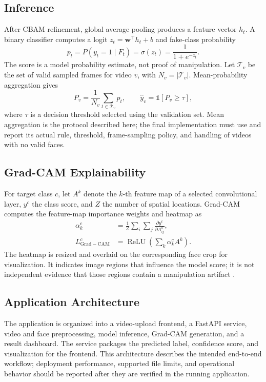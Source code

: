 \subsection{Inference}
After CBAM refinement, global average pooling produces a feature vector $h_t$. A binary classifier computes a logit $z_t=\mathbf{w}^{\top}h_t+b$ and fake-class probability
\begin{equation}
    p_t=P(y_t=1\mid F_t)=\sigma(z_t)=\frac{1}{1+e^{-z_t}}.
    \label{eq:frame-probability}
\end{equation}
The score is a model probability estimate, not proof of manipulation. Let $\mathcal{T}_v$ be the set of valid sampled frames for video $v$, with $N_v=|\mathcal{T}_v|$. Mean-probability aggregation gives
\begin{equation}
    P_v=\frac{1}{N_v}\sum_{t\in\mathcal{T}_v}p_t,\qquad
    \hat{y}_v=\mathbb{1}[P_v\geq\tau],
    \label{eq:video-aggregation}
\end{equation}
where $\tau$ is a decision threshold selected using the validation set. Mean aggregation is the protocol described here; the final implementation must use and report its actual rule, threshold, frame-sampling policy, and handling of videos with no valid faces.

\subsection{Grad-CAM Explainability}
For target class $c$, let $A^k$ denote the $k$-th feature map of a selected convolutional layer, $y^c$ the class score, and $Z$ the number of spatial locations. Grad-CAM computes the feature-map importance weights and heatmap as
\begin{equation}
    \begin{aligned}
        \alpha_k^c&=\frac{1}{Z}\sum_i\sum_j
        \frac{\partial y^c}{\partial A_{ij}^k},\\
        L_{\mathrm{Grad-CAM}}^c&=\operatorname{ReLU}\!\left(\sum_k\alpha_k^cA^k\right).
    \end{aligned}
    \label{eq:gradcam}
\end{equation}
The heatmap is resized and overlaid on the corresponding face crop for visualization. It indicates image regions that influence the model score; it is not independent evidence that those regions contain a manipulation artifact \cite{selvaraju2017gradcam}.

\subsection{Application Architecture}
The application is organized into a video-upload frontend, a FastAPI service, video and face preprocessing, model inference, Grad-CAM generation, and a result dashboard. The service packages the predicted label, confidence score, and visualization for the frontend. This architecture describes the intended end-to-end workflow; deployment performance, supported file limits, and operational behavior should be reported after they are verified in the running application.
